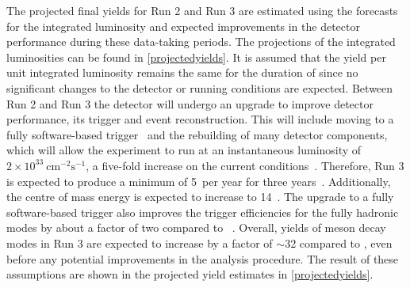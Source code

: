 The projected final yields for Run 2 and Run 3 are estimated using the forecasts for the integrated luminosity and expected improvements in the detector performance during these data-taking periods. The projections of the integrated luminosities can be found in \tab\ref{projectedyields}. It is assumed that the yield per unit integrated luminosity remains the same for the duration of \runtwo since no significant changes to the detector or running conditions are expected. Between Run 2 and Run 3 the detector will undergo an upgrade to improve detector performance, its trigger and event reconstruction. This will include moving to a fully software-based trigger~\cite{CERN-LHCC-2014-016} and the rebuilding of many detector components, which will allow the experiment to run at an instantaneous luminosity of $2 \times 10^{33}~\text{cm}^{-2}\text{s}^{-1}$, a five-fold increase on the current conditions~\cite{CERN-LHCC-2014-016}. Therefore, Run 3 is expected to produce a minimum of 5~\invfb per year for three years~\cite{CERN-LHCC-2014-016}. Additionally, the centre of mass energy is expected to increase to 14~\tev. The upgrade to a fully software-based trigger also improves the trigger efficiencies for the fully hadronic modes by about a factor of two compared to \runone~\cite{CERN-LHCC-2014-016}. Overall, yields of \B meson decay modes in Run 3 are expected to increase by a factor of $\sim$32 compared to \runone, even before any potential improvements in the analysis procedure. The result of these assumptions are shown in the projected yield estimates in \tab\ref{projectedyields}.

\begin{table}
\caption{Yields and projected yields for the data-taking periods of the LHC. The entries in bold are projected yields, whereas the other entries refer to data used in this thesis. Projected results are justified in the text, with information taken from Ref.~\cite{CERN-LHCC-2014-016}.}
\label{projectedyields}
\end{table}

